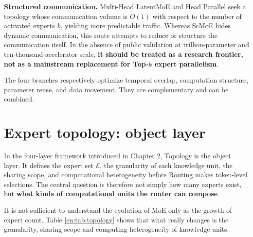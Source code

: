 \documentclass[10pt,a4paper,fontset=none]{ctexart}
\newcommand{\term}[1]{\textbf{#1}}
\begin{document}
\textbf{Structured communication.} Multi-Head LatentMoE and Head Parallel seek a topology whose communication volume is $O(1)$ with respect to the number of activated experts $k$, yielding more predictable traffic\cite{en:cui2026latentmoe}. Whereas ScMoE hides dynamic communication, this route attempts to reduce or structure the communication itself. In the absence of public validation at trillion-parameter and ten-thousand-accelerator scale, \term{it should be treated as a research frontier, not as a mainstream replacement for Top-$k$ expert parallelism}.

The four branches respectively optimize temporal overlap, computation structure, parameter reuse, and data movement. They are complementary and can be combined.

\section{Expert topology: object layer}

In the four-layer framework introduced in Chapter 2, Topology is the object layer. It defines the expert set $\mathcal{E}$, the granularity of each knowledge unit, the sharing scope, and computational heterogeneity before Routing makes token-level selections. The central question is therefore not simply how many experts exist, but \term{what kinds of computational units the router can compose}.

It is not sufficient to understand the evolution of MoE only as the growth of expert count. Table \ref{en:tab:topology} shows that what really changes is the granularity, sharing scope and computing heterogeneity of knowledge units.
\end{document}
